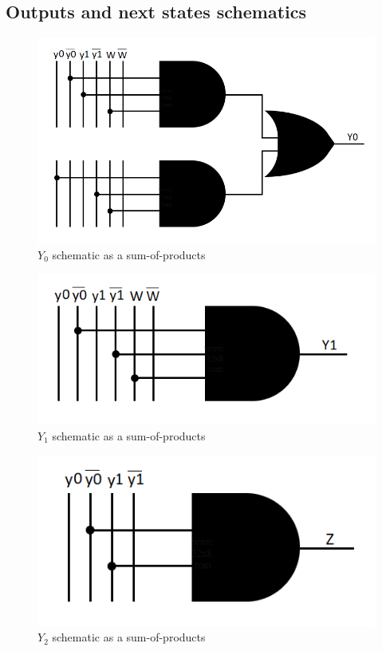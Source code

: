 \documentclass[../../e3_tp3_main.tex]{subfiles}
\begin{document}
\subsection{Outputs and next states schematics}
\begin{figure}[H]
	\centering
	\includegraphics{figures/ej3_Y0_schem_moore.PNG}
	\caption{$Y_0$ schematic as a sum-of-products}
\end{figure}
\begin{figure}[H]
	\centering
	\includegraphics{figures/ej3_Y1_schem_moore.PNG}
	\caption{$Y_1$ schematic as a sum-of-products}
\end{figure}
\begin{figure}[H]
	\centering
	\includegraphics{figures/ej3_Z_schem_moore.PNG}
	\caption{$Y_2$ schematic as a sum-of-products}
\end{figure}
\end{document}
